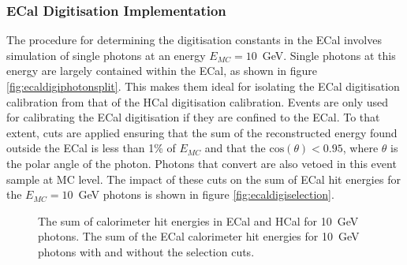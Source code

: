 \subsubsection{ECal Digitisation Implementation}
\label{sec:ecaldigi}
The procedure for determining the digitisation constants in the ECal involves simulation of single photons at an energy $E_{MC} = 10$~GeV.  Single photons at this energy are largely contained within the ECal, as shown in figure \ref{fig:ecaldigiphotonsplit}.  This makes them ideal for isolating the ECal digitisation calibration from that of the HCal digitisation calibration.  Events are only used for calibrating the ECal digitisation if they are confined to the ECal.  To that extent, cuts are applied ensuring that the sum of the reconstructed energy found outside the ECal is less than 1\% of $E_{MC}$ and that the $\text{cos}(\theta) < 0.95$, where $\theta$ is the polar angle of the photon.  Photons that convert are also vetoed in this event sample at MC level.  The impact of these cuts on the sum of ECal hit energies for the $E_{MC} = 10$~GeV photons is shown in figure \ref{fig:ecaldigiselection}.

\begin{figure}[h!]
\caption[\protect{} The sum of calorimeter hit energies in ECal and HCal for 10~GeV photons.  \protect{} The sum of the ECal calorimeter hit energies for 10~GeV photons with and without the selection cuts.]{\protect{} The sum of calorimeter hit energies in ECal and HCal for 10~GeV photons.  \protect{} The sum of the ECal calorimeter hit energies for 10~GeV photons with and without the selection cuts.}
\label{fig:ecaldigi}
\end{figure}

